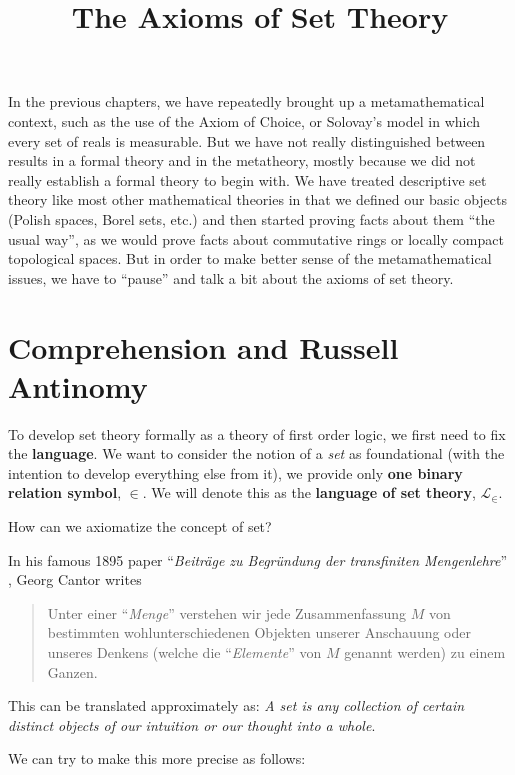 \documentclass{article}
\title{The Axioms of Set Theory}
\date{\displaydate{articleDate}}
\author{}
\begin{document}
\maketitle

In the previous chapters, we have repeatedly brought up a metamathematical context, such as the use of the Axiom of Choice, or Solovay's model in which every set of reals is measurable. But we have not really distinguished between results in a formal theory and in the metatheory, mostly because we did not really establish a formal theory to begin with. We have treated descriptive set theory like most other mathematical theories in that we defined our basic objects (Polish spaces, Borel sets, etc.) and then started proving facts about them ``the usual way'', as we would prove facts about commutative rings or locally compact topological spaces. But in order to make better sense of the metamathematical issues, we have to ``pause'' and talk a bit about the axioms of set theory.

\section{Comprehension and Russell Antinomy}

To develop set theory formally as a theory of first order logic, we first need to fix the \textbf{language}. We want to consider the notion of a \textit{set} as foundational (with the intention to develop everything else from it), we provide only \textbf{one binary relation symbol}, $\in$. We will denote this as the \textbf{language of set theory}, $\mathcal{L}_\in$.

How can we axiomatize the concept of set?

In his famous 1895 paper ``\textit{Beiträge zu Begründung der transfiniten Mengenlehre}'' \cite{Cantor_1895s}, Georg Cantor writes

\begin{quote}
Unter einer ``\textit{Menge}'' verstehen wir jede Zusammenfassung $M$ von bestimmten wohlunterschiedenen Objekten unserer Anschauung oder unseres Denkens (welche die ``\textit{Elemente}'' von  $M$  genannt werden)  zu einem Ganzen.
\end{quote}

This can be translated approximately as: \textit{A set is any collection of certain distinct objects of our intuition or our thought into a whole}.

We can try to make this more precise as follows:
\end{document}
